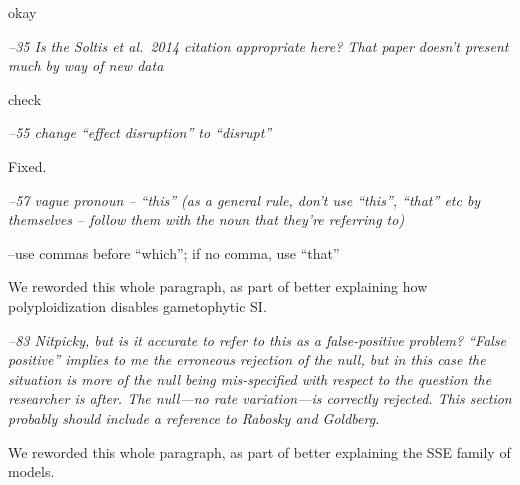 \documentclass[11pt]{article}
\renewenvironment{quote}{\bigskip\noindent\itshape\ignorespaces}{\smallskip}
\begin{document}
okay %

\begin{quote}
--35 Is the Soltis et al.\ 2014 citation appropriate here?
That paper doesn't present much by way of new data
\end{quote}

check %

\begin{quote}
--55 change ``effect disruption'' to ``disrupt''
\end{quote}

Fixed.

\begin{quote}
--57 vague pronoun -- ``this'' (as a general rule, don't use ``this'', ``that'' etc by themselves -- follow them with the noun that they're referring to)

--use commas before ``which''; if no comma, use ``that''
\end{quote}

We reworded this whole paragraph, as part of better explaining how polyploidization disables gametophytic SI.

\begin{quote}
--83 Nitpicky, but is it accurate to refer to this as a false-positive problem?
``False positive'' implies to me the erroneous rejection of the null, but in this case the situation is more of the null being mis-specified with respect to the question the researcher is after.
The null---no rate variation---is correctly rejected.
This section probably should include a reference to Rabosky and Goldberg.
\end{quote}

We reworded this whole paragraph, as part of better explaining the SSE family of models.
\end{document}
